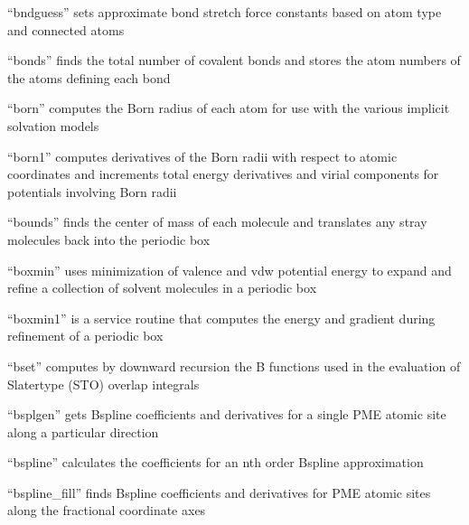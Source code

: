 \documentclass[letterpaper,11pt,english]{sphinxmanual}
\begin{document}

“bndguess” sets approximate bond stretch force constants based
on atom type and connected atoms


“bonds” finds the total number of covalent bonds and
stores the atom numbers of the atoms defining each bond


“born” computes the Born radius of each atom for use with
the various implicit solvation models


“born1” computes derivatives of the Born radii with respect
to atomic coordinates and increments total energy derivatives
and virial components for potentials involving Born radii


“bounds” finds the center of mass of each molecule and
translates any stray molecules back into the periodic box


“boxmin” uses minimization of valence and vdw potential energy
to expand and refine a collection of solvent molecules in a
periodic box


“boxmin1” is a service routine that computes the energy and
gradient during refinement of a periodic box


“bset” computes by downward recursion the B functions used
in the evaluation of Slater\sphinxhyphen{}type (STO) overlap integrals


“bsplgen” gets B\sphinxhyphen{}spline coefficients and derivatives for
a single PME atomic site along a particular direction


“bspline” calculates the coefficients for an n\sphinxhyphen{}th order
B\sphinxhyphen{}spline approximation


“bspline\_fill” finds B\sphinxhyphen{}spline coefficients and derivatives
for PME atomic sites along the fractional coordinate axes
\end{document}
